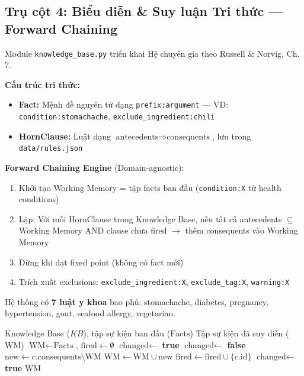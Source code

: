 \subsection{Trụ cột 4: Biểu diễn \& Suy luận Tri thức --- Forward Chaining}
\label{sec:logic}

Module \texttt{knowledge\_base.py} triển khai Hệ chuyên gia theo Russell \& Norvig, Ch. 7.

\textbf{Cấu trúc tri thức:}
\begin{itemize}
  \item \textbf{Fact:} Mệnh đề nguyên tử dạng \texttt{prefix:argument} --- VD: \texttt{condition:stomachache}, \texttt{exclude\_ingredient:chili}
  \item \textbf{HornClause:} Luật dạng $\text{antecedents} \Rightarrow \text{consequents}$, lưu trong \texttt{data/rules.json}
\end{itemize}

\textbf{Forward Chaining Engine} (Domain-agnostic):
\begin{enumerate}
  \item Khởi tạo Working Memory = tập facts ban đầu (\texttt{condition:X} từ health conditions)
  \item Lặp: Với mỗi HornClause trong Knowledge Base, nếu tất cả antecedents $\subseteq$ Working Memory AND clause chưa fired $\to$ thêm consequents vào Working Memory
  \item Dừng khi đạt fixed point (không có fact mới)
  \item Trích xuất exclusions: \texttt{exclude\_ingredient:X}, \texttt{exclude\_tag:X}, \texttt{warning:X}
\end{enumerate}

Hệ thống có \textbf{7 luật y khoa} bao phủ: stomachache, diabetes, pregnancy, hypertension, gout, seafood allergy, vegetarian.

\begin{algorithm}[H]
\caption{Forward Chaining (Suy diễn tiến)}
\begin{algorithmic}[1]
\REQUIRE Knowledge Base ($KB$), tập sự kiện ban đầu ($\text{Facts}$)
\ENSURE Tập sự kiện đã suy diễn ($\text{WM}$)
\STATE $\text{WM} \leftarrow \text{Facts}$, $\text{fired} \leftarrow \emptyset$
\STATE $\text{changed} \leftarrow$ \textbf{true}
    \STATE $\text{changed} \leftarrow$ \textbf{false}
            \STATE $\text{new} \leftarrow c.\text{consequents} \setminus \text{WM}$
                \STATE $\text{WM} \leftarrow \text{WM} \cup \text{new}$
                \STATE $\text{fired} \leftarrow \text{fired} \cup \{c.\text{id}\}$
                \STATE $\text{changed} \leftarrow$ \textbf{true}
            \ENDIF
        \ENDIF
    \ENDFOR
\ENDWHILE
\RETURN $\text{WM}$
\end{algorithmic}
\end{algorithm}

